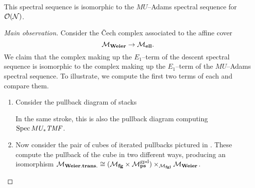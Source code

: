 \begin{lemma}
This spectral sequence is isomorphic to the $MU$--Adams spectral sequence for $\sheaf O(\stack N)$.
\end{lemma}
\begin{proof}[Main observation]
Consider the \v{C}ech complex associated to the affine cover \[\moduli{Weier} \to \moduli{ell}.\]  We claim that the complex making up the $E_1$--term of the descent spectral sequence is isomorphic to the complex making up the $E_1$--term of the $MU$--Adams spectral sequence.  To illustrate, we compute the first two terms of each and compare them.
\begin{enumerate}
    \item Consider the pullback diagram of stacks
    \begin{center}
    \end{center}
    In the same stroke, this is also the pullback diagram computing $\Spec MU_* \TMF$.
    \item Now consider the pair of cubes of iterated pullbacks pictured in .  These compute the pullback of the cube in two different ways, producing an isomorphism $\moduli{Weier.trans.} \cong (\moduli{fg} \times \moduli{ps}^{\mathrm{gpd}}) \times_{\moduli{fgl}} \moduli{Weier}$.
\begin{figure}
    \begin{center}
     \hspace{1em}
    \begin{tikzcd}[column sep=-1em]

\end{tikzcd}
\end{center}
\end{figure}
\end{enumerate}
\end{proof}
